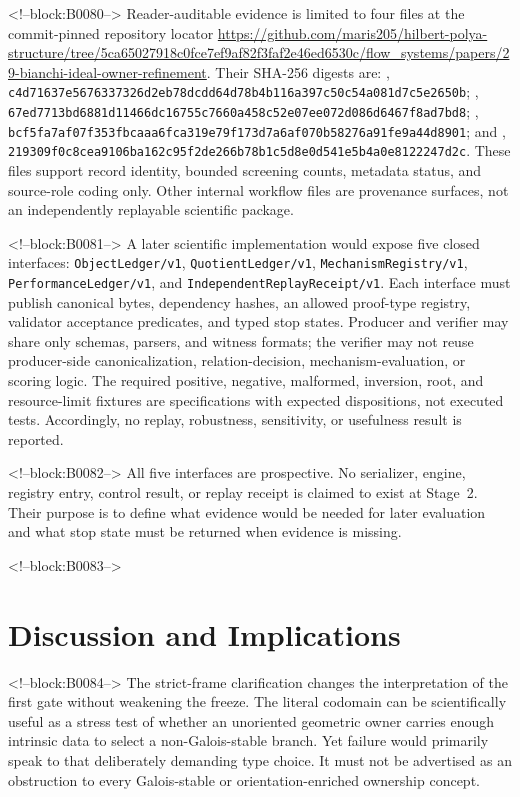 \documentclass[11pt,a4paper]{article}
\begin{document}
<!--block:B0080-->
Reader-auditable evidence is limited to four files at the commit-pinned repository locator \url{https://github.com/maris205/hilbert-polya-structure/tree/5ca65027918c0fce7ef9af82f3faf2e46ed6530c/flow_systems/papers/29-bianchi-ideal-owner-refinement}. Their SHA-256 digests are: , \texttt{c4d71637e5676337326d2eb78dcdd64d78b4b116a397c50c54a081d7c5e2650b}; , \texttt{67ed7713bd6881d11466dc16755c7660a458c52e07ee072d086d6467f8ad7bd8}; , \texttt{bcf5fa7af07f353fbcaaa6fca319e79f173d7a6af070b58276a91fe9a44d8901}; and , \texttt{219309f0c8cea9106ba162c95f2de266b78b1c5d8e0d541e5b4a0e8122247d2c}. These files support record identity, bounded screening counts, metadata status, and source-role coding only. Other internal workflow files are provenance surfaces, not an independently replayable scientific package.

<!--block:B0081-->
A later scientific implementation would expose five closed interfaces: \texttt{ObjectLedger/v1}, \texttt{QuotientLedger/v1}, \texttt{MechanismRegistry/v1}, \texttt{PerformanceLedger/v1}, and \texttt{IndependentReplayReceipt/v1}. Each interface must publish canonical bytes, dependency hashes, an allowed proof-type registry, validator acceptance predicates, and typed stop states. Producer and verifier may share only schemas, parsers, and witness formats; the verifier may not reuse producer-side canonicalization, relation-decision, mechanism-evaluation, or scoring logic. The required positive, negative, malformed, inversion, root, and resource-limit fixtures are specifications with expected dispositions, not executed tests. Accordingly, no replay, robustness, sensitivity, or usefulness result is reported.

<!--block:B0082-->
All five interfaces are prospective. No serializer, engine, registry entry, control result, or replay receipt is claimed to exist at Stage~2. Their purpose is to define what evidence would be needed for later evaluation and what stop state must be returned when evidence is missing.

<!--block:B0083-->
\section{Discussion and Implications}

<!--block:B0084-->
The strict-frame clarification changes the interpretation of the first gate without weakening the freeze. The literal codomain can be scientifically useful as a stress test of whether an unoriented geometric owner carries enough intrinsic data to select a non-Galois-stable branch. Yet failure would primarily speak to that deliberately demanding type choice. It must not be advertised as an obstruction to every Galois-stable or orientation-enriched ownership concept.
\end{document}
